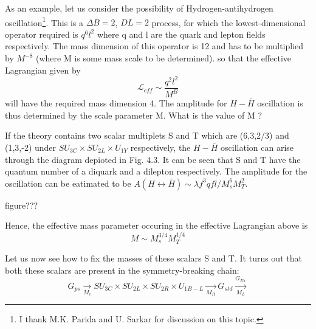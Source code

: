 As an example, let us consider the possibility of Hydrogen-antihydrogen oscillation\footnote{I thank M.K. Parida and U. Sarkar for discussion on this topic.}. This is a $\Delta B =2$, $D L =2$ process, for which the lowest-dimensional operator required is $q^{6}$$l^{2}$ where q and l are the quark and lepton fields respectively. The mass dimension of this operator is 12 and has to be multiplied by $M^{-8}$ (where M is some mass scale to be determined). so that the effective Lagrangian given by
$$
\mathcal{L}_{eff} \sim \frac{q^{2}l^{2}}{M^{B}}
$$
will have the required mass dimension 4. The amplitude for $H-\bar{H}$ oscillation is thus determined by the scale parameter M. What is the value of M ?

If the theory contains two scalar multiplets S and T which are (6,3,2/3) and (1,3,-2) under $SU_{3C} \times SU_{2L} \times U_{1Y}$ respectively, the $H-\bar{H}$ oscillation can arise through the diagram depioted in Fig. 4.3. It can be seen that S and T have the quantum number of a diquark and a dilepton respectively. The amplitude for the oscillation can be eatimated to be $A (H \leftrightarrow \bar{H}) \sim \lambda f^{3}q fl/M^{6}_{s} M^{2}_{T}$.

figure???


Hence, the effective mass parameter occuring in the effective Lagrangian above is 
$$
M \sim M^{3/4}_{s} M^{1/4}_{T}
$$

Let us now see how to fix the masses of these scalars S and T. It turns out that both these scalars are present in the symmetry-breaking chain:
$$
G_{ps} \xrightarrow[M_{c}]{} SU_{3C} \times SU_{2L} \times SU_{2R} \times U_{1B-L}\xrightarrow[M_{R}]{} G_{std}\xrightarrow[M_{L}]{G_{Ex}}
$$


